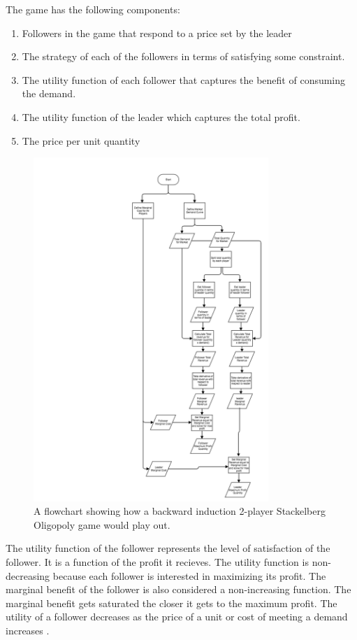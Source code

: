 \documentclass[phd, 12pt, print]{fauthesis}
\begin{document}
The game has the following components:

\begin{enumerate}
	\item Followers in the game that respond to a price set by the leader
	\item The strategy of each of the followers in terms of satisfying some constraint.
	\item The utility function of each follower that captures the benefit of consuming the demand.
	\item The utility function of the leader which captures the total profit.
	\item The price per unit quantity
\end{enumerate}


\begin{figure}[th]
  \centering
  \includegraphics[width=3.5in]{Figures/stakelberggame.png}
  \caption[A Stackelberg Game Flowchart]{A flowchart showing how a backward induction 2-player Stackelberg Oligopoly game would play out.}
  \label{fig:StackelbergGame}
\end{figure}


The utility function of the follower represents the level of 
satisfaction of the follower. It is a function of the profit it recieves. 
The utility function is non-decreasing because each follower is 
interested in maximizing its profit. The marginal benefit of the 
follower is also considered a non-increasing function. The marginal 
benefit gets saturated the closer it gets to the maximum profit. 
The utility of a follower decreases as the price of a unit or cost 
of meeting a demand increases .
\end{document}
